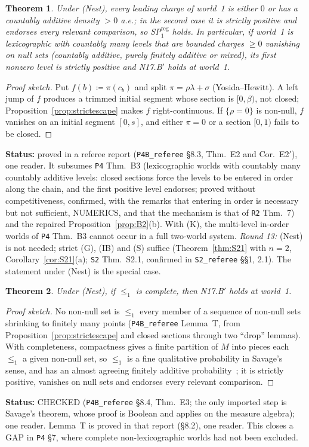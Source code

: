 \documentclass[11pt]{article}
\newtheorem{theorem}{Theorem}[section]
\theoremstyle{definition}
\theoremstyle{remark}
\newcommand{\src}[1]{\texttt{#1}}
\newcommand{\status}[1]{\par\smallskip\noindent\textbf{Status:} #1\par\smallskip}
\begin{document}
\begin{theorem}\label{thm:E2}
Under (Nest), every leading charge of world~1 is either $0$ or has a countably additive density $>0$ a.e.; in the second case it is strictly positive and endorses every relevant comparison, so SP$^{\mathrm{reg}}_1$ holds. In particular, if world~1 is lexicographic with countably many levels that are bounded charges $\ge0$ vanishing on null sets (countably additive, purely finitely additive or mixed), its first nonzero level is strictly positive and N17.B$'$ holds at world~1.
\end{theorem}
\begin{proof}[Proof sketch]
Put $f(b)\coloneqq\pi(c_b)$ and split $\pi=\rho\lambda+\sigma$ (Yosida--Hewitt). A left jump of $f$ produces a trimmed initial segment whose section is $[0,\beta)$, not closed; Proposition~\ref{prop:strictescape} makes $f$ right-continuous. If $\{\rho=0\}$ is non-null, $f$ vanishes on an initial segment $[0,s]$, and either $\pi=0$ or a section $[0,1)$ fails to be closed.
\end{proof}
\status{proved in a referee report (\src{P4B\_referee} \S8.3, Thm.~E2 and Cor.~E2$'$), one reader. It subsumes \src{P4} Thm.~B3 (lexicographic worlds with countably many countably additive levels: closed sections force the levels to be entered in order along the chain, and the first positive level endorses; proved without competitiveness, confirmed, with the remarks that entering in order is necessary but not sufficient, NUMERICS, and that the mechanism is that of \src{R2} Thm.~7) and the repaired Proposition~\ref{prop:B2}(b). With (K), the multi-level in-order worlds of \src{P4} Thm.~B3 cannot occur in a full two-world system. \emph{Round 13:} (Nest) is not needed; strict (G), (IB) and (S) suffice (Theorem~\ref{thm:S21} with $n=2$, Corollary~\ref{cor:S21}(a); \src{S2} Thm.~S2.1, confirmed in \src{S2\_referee} \S\S1, 2.1). The statement under (Nest) is the special case.}

\begin{theorem}\label{thm:E3}
Under (Nest), if $\le_1$ is complete, then N17.B$'$ holds at world~1.
\end{theorem}
\begin{proof}[Proof sketch]
No non-null set is $\le_1$ every member of a sequence of non-null sets shrinking to finitely many points (\src{P4B\_referee} Lemma~T, from Proposition~\ref{prop:strictescape} and closed sections through two ``drop'' lemmas). With completeness, compactness gives a finite partition of $M$ into pieces each $\le_1$ a given non-null set, so $\le_1$ is a fine qualitative probability in Savage's sense, and has an almost agreeing finitely additive probability~\cite{Sav1954,Fis1986}; it is strictly positive, vanishes on null sets and endorses every relevant comparison.
\end{proof}
\status{CHECKED (\src{P4B\_referee} \S8.4, Thm.~E3; the only imported step is Savage's theorem, whose proof is Boolean and applies on the measure algebra); one reader. Lemma~T is proved in that report (\S8.2), one reader. This closes a GAP in \src{P4} \S7, where complete non-lexicographic worlds had not been excluded.}
\end{document}
